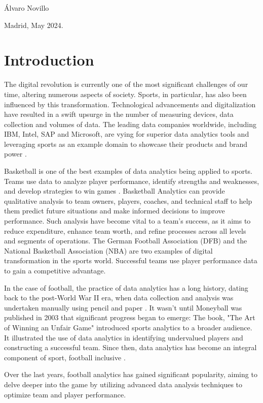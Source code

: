 \documentclass[
  10pt,
  twoside,nohyper]{book}
\begin{document}
\hfill Álvaro Novillo

\hfill Madrid, May 2024.

\listoffigures
\listoftables

\chapter{Introduction}\label{introduction}

The digital revolution is currently one of the most significant
challenges of our time, altering numerous aspects of society. Sports,
in particular, has also been influenced by this transformation.
Technological advancements and digitalization have resulted in a swift
upsurge in the number of measuring devices, data collection and volumes
of data. The leading data companies worldwide, including IBM, Intel, SAP
and Microsoft, are vying for superior data analytics tools and
leveraging sports as an example domain to showcase their products and
brand power \autocite{1}.

Basketball is one of the best examples of data analytics being
applied to sports. Teams use data to analyze player performance, identify strengths and weaknesses, and develop strategies to win games \autocite{2}. Basketball Analytics can provide qualitative analysis to team owners, players, coaches, and technical staff to help them predict future situations and make informed decisions to improve performance. Such analysis have become vital to a team's success, as it aims to reduce expenditure, enhance team worth, and refine processes across all levels and segments of operations. The German Football Association (DFB) and the National Basketball Association (NBA) are two examples of digital transformation in the sports world. Successful teams use player performance data to gain a competitive advantage.

In the case of football, the practice of data analytics has a long history, dating
back to the post-World War II era, when data collection and analysis was
undertaken manually using pencil and paper \autocite{1}. It wasn't until
Moneyball was published in 2003 that significant progress began to
emerge: The book, "The Art of Winning an Unfair Game" introduced
sports analytics to a broader audience. It illustrated the use of data
analytics in identifying undervalued players and constructing a
successful team. Since then, data analytics has become an integral
component of sport, football inclusive \autocite{1}.

Over the last years, football analytics has gained significant
popularity, aiming to delve deeper into the game by utilizing advanced
data analysis techniques to optimize team and player performance.
\end{document}
